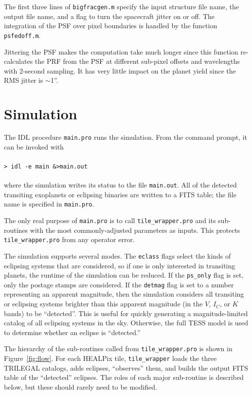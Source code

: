 \documentclass[preprint,10pt]{aastex}
\begin{document}
The first three lines of \texttt{bigfracgen.m} specify the input structure file name, the output file name, and a flag to turn the spacecraft jitter on or off. 
The integration of the PSF over pixel boundaries is handled by the function \texttt{psfedoff.m}. 

Jittering the PSF makes the computation take much longer since this function re-calculates the PRF from the PSF at different sub-pixel offsets and wavelengths with 2-second sampling. It has very little impact on the planet yield since the RMS jitter is $\sim$1''.

\section{Simulation}
The IDL procedure \texttt{main.pro} runs the simulation. From the command prompt, it can be invoked with \\
\\
\texttt{> idl -e main \&>main.out}\\
\\
where the simulation writes its status to the file \texttt{main.out}. 
All of the detected transiting exoplanets or eclipsing binaries are written to a FITS table; the file name is specified in \texttt{main.pro}.

The only real purpose of \texttt{main.pro} is to call \texttt{tile\_wrapper.pro} and its sub-routines with the most commonly-adjusted parameters as inputs. This protects \texttt{tile\_wrapper.pro} from any operator error. 

The simulation supports several modes. The \texttt{eclass} flags select the kinds of eclipsing systems that are considered, so if one is only interested in transiting planets, the runtime of the simulation can be reduced. If the \texttt{ps\_only} flag is set, only the postage stamps are considered. If the \texttt{detmag} flag is set to a number representing an apparent magnitude, then the simulation considers all transiting or eclipsing systems brighter than this apparent magnitude (in the $V$, $I_C$, or $K$ bands) to be ``detected''. This is useful for quickly generating a magnitude-limited catalog of all eclipsing systems in the sky. Otherwise, the full TESS model is used to determine whether an eclipse is ``detected.''

The hierarchy of the sub-routines called from \texttt{tile\_wrapper.pro} is shown in Figure~\ref{fig:flow}. For each HEALPix tile, \texttt{tile\_wrapper} loads the three TRILEGAL catalogs, adds eclipses, ``observes'' them, and builds the output FITS table of the ``detected'' eclipses. The roles of each major sub-routine is described below, but these should rarely need to be modified.
\end{document}
